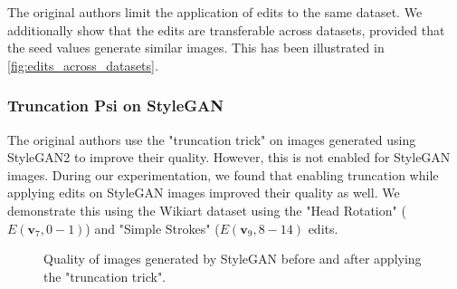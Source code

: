 \documentclass{article}
\begin{document}
The original authors limit the application of edits to the same dataset. We additionally show that the edits are transferable across datasets, provided that the seed values generate similar images. This has been illustrated in \ref{fig:edits_across_datasets}.

\subsubsection{Truncation Psi on StyleGAN}

The original authors use the "truncation trick" on images generated using StyleGAN2 to improve their quality. However, this is not enabled for StyleGAN images. During our experimentation, we found that enabling truncation while applying edits on StyleGAN images improved their quality as well. We demonstrate this using the Wikiart dataset using the "Head Rotation" ($E(\textbf{v}_{7}, 0-1)$) and "Simple Strokes" ($E(\textbf{v}_{9}, 8-14)$ edits.

\begin{figure}[H]



\caption{Quality of images generated by StyleGAN before and after applying the "truncation trick".}

\end{figure}
\end{document}
